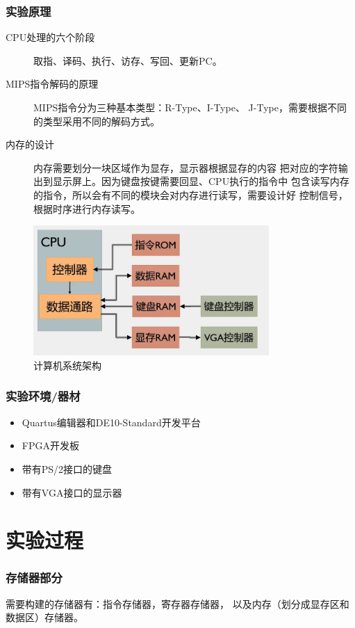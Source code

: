 \documentclass[12pt,a4paper,UTF8]{article}
\begin{document}
\section{实验原理}
\begin{description}
  \item[CPU处理的六个阶段] 取指、译码、执行、访存、写回、更新PC。
  \item[MIPS指令解码的原理] MIPS指令分为三种基本类型：R-Type、I-Type、
        J-Type，需要根据不同的类型采用不同的解码方式。
  \item[内存的设计] 内存需要划分一块区域作为显存，显示器根据显存的内容
        把对应的字符输出到显示屏上。因为键盘按键需要回显、CPU执行的指令中
        包含读写内存的指令，所以会有不同的模块会对内存进行读写，需要设计好
        控制信号，根据时序进行内存读写。
\end{description}
\begin{figure}[H]
  \centering
  \includegraphics[width=0.8\textwidth]{system_struct.JPG}
  \caption{计算机系统架构}
  \label{system_struct}
\end{figure}


\section{实验环境/器材}
\begin{itemize}
  \item Quartus编辑器和DE10-Standard开发平台
  \item FPGA开发板
  \item 带有PS/2接口的键盘
  \item 带有VGA接口的显示器
\end{itemize}
\newpage

\part{实验过程}
\section{存储器部分}
需要构建的存储器有：指令存储器，寄存器存储器，
以及内存（划分成显存区和数据区）存储器。
\end{document}

